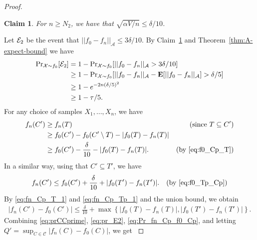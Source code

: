 \documentclass[final,12pt]{colt2018}
\newcommand{\nnew}[1]{{\color{red} #1}}
\newcommand{\nnew}[1]{#1}
\newtheorem{informal theorem}[theorem]{Theorem (informal statement)}
\newtheorem{claim}[theorem]{Claim}
\newcommand{\E}{\mathbf{E}}
\begin{document}
\begin{proof}
\begin{claim}\label{claim:easy_vc}
 {For $n \geq N_2$, we have that $\sqrt{\alpha V / n} \leq \delta / 10$}. %
\end{claim}

\nnew{
Let ${\cal E}_2$ be the event that $||f_0-f_n||_{\mathcal{A}} \leq 3\delta/10$.
By Claim~\ref{claim:easy_vc} and Theorem~\ref{thm:A-expect-bound} we have
\begin{align}
{\Pr}_{\mathcal{X}\sim f_0}[{\cal E}_2] 
&= 1 - {\Pr}_{\mathcal{X}\sim f_0}[||f_0-f_n||_{\mathcal{A}} > 3\delta/10] \notag \\
&\geq 1 - {\Pr}_{\mathcal{X}\sim f_0}[||f_0-f_n||_{\mathcal{A}} - \E[||f_0-f_n||_{\mathcal{A}}] > \delta/5] \notag \\
&\geq 1 - e^{-2n(\delta/5)^2} \notag \\
&\geq 1 - \tau/5. \label{eq:pr_E2}
\end{align}
For any choice of samples $X_1,\ldots,X_n$, we have
\begin{align}
f_n(C') &\geq f_n(T) & \text{(since $T\subseteq C'$)} \notag \\
 &\geq f_0(C') - f_0(C'\setminus T) - |f_0(T)-f_n(T)| \notag \\
 &\geq f_0(C') - \frac{\delta}{10} - |f_0(T)-f_n(T)|. & \text{(by \eqref{eq:f0_Cp_T})} \label{eq:fn_Cp_T_1}
\end{align}
In a similar way, using that $C'\subseteq T'$, we have
\begin{align}
f_n(C') %
 &\leq f_0(C') + \frac{\delta}{10} + |f_0(T')-f_n(T')|. & \text{(by \eqref{eq:f0_Tp_Cp})} \label{eq:fn_Cp_Tp_1}
\end{align}
By \eqref{eq:fn_Cp_T_1} and \eqref{eq:fn_Cp_Tp_1} and the union bound, we obtain
\begin{align}
|f_n(C')-f_0(C')| \leq \frac{\delta}{10} + \max\left\{ |f_0(T)-f_n(T)|, |f_0(T')-f_n(T')| \right\}. \label{eq:Pr_fn_Cp_f0_Cp}
\end{align}
Combining \eqref{eq:prCCprime}, \eqref{eq:pr_E2}, \eqref{eq:Pr_fn_Cp_f0_Cp}, 
and letting $Q' = \sup_{C \in \mathcal{C}} |f_n(C)-f_0(C)|$, we get
}
\end{proof}
\end{document}
